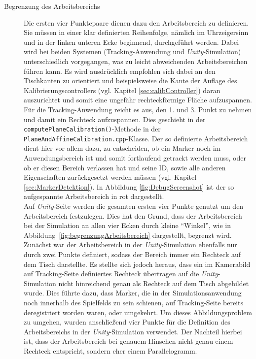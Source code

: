 \begin{description}
\item[Begrenzung des Arbeitsbereichs] Die ersten vier Punktepaare dienen dazu den Arbeitsbereich zu definieren. Sie müssen in einer klar definierten Reihenfolge, nämlich im Uhrzeigersinn und in der linken unteren Ecke beginnend, durchgeführt werden. Dabei wird bei beiden Systemen (Tracking-Anwendung und \emph{Unity}-Simulation) unterschiedlich vorgegangen, was zu leicht abweichenden Arbeitsbereichen führen kann. Es wird ausdrücklich empfohlen sich dabei an den Tischkanten zu orientiert und beispielsweise die Kante der Auflage des Kalibrierungscontrollers (vgl. Kapitel \ref{sec:calibController}) daran auszurichtet und somit eine ungefähr rechteckförmige Fläche aufzuspannen. \\
Für die Tracking-Anwendung reicht es aus, den 1. und 3. Punkt zu nehmen und damit ein Rechteck aufzuspannen. Dies geschieht in der \texttt{compute\-Plane\-Cali\-bration()}-Methode in der \texttt{Plane\-And\-Affine\-Calibration.cpp}-Klasse. Der so definierte Arbeitsbereich dient hier vor allem dazu, zu entscheiden, ob ein Marker noch im Anwendungsbereich ist und somit fortlaufend getrackt werden muss, oder ob er diesen Bereich verlassen hat und seine ID, sowie alle anderen Eigenschaften zurückgesetzt werden müssen (vgl. Kapitel \ref{sec:MarkerDetektion}). In Abbildung \ref{fig:DebugScreenshot} ist der so aufgespannte Arbeitsbereich in rot dargestellt.\\
Auf \emph{Unity}-Seite werden die gesamten ersten vier Punkte genutzt um den Arbeitsbereich festzulegen. Dies hat den Grund, dass der Arbeitsbereich bei der Simulation an allen vier Ecken durch kleine "`Winkel"', wie in Abbildung~\ref{fig:begrenzungArbeitsbereich} dargestellt, begrenzt wird. Zunächst war der Arbeitsbereich in der \emph{Unity}-Simulation ebenfalls nur durch zwei Punkte definiert, sodass der Bereich immer ein Rechteck auf dem Tisch darstellte. Es stellte sich jedoch heraus, dass ein im Kamerabild auf Tracking-Seite definiertes Rechteck übertragen auf die \emph{Unity}-Simulation nicht hinreichend genau als Rechteck auf dem Tisch abgebildet wurde. Dies führte dazu, dass Marker, die in der Simulationsanwendung noch innerhalb des Spielfelds zu sein schienen, auf Tracking-Seite bereits deregistriert worden waren, oder umgekehrt. Um dieses Abbildungsproblem zu umgehen, wurden anschließend vier Punkte für die Definition des Arbeitsbereichs in der \emph{Unity}-Simulation verwendet. Der Nachteil hierbei ist, dass der Arbeitsbereich bei genauem Hinsehen nicht genau einem Rechteck entspricht, sondern eher einem Parallelogramm.


\end{description}
